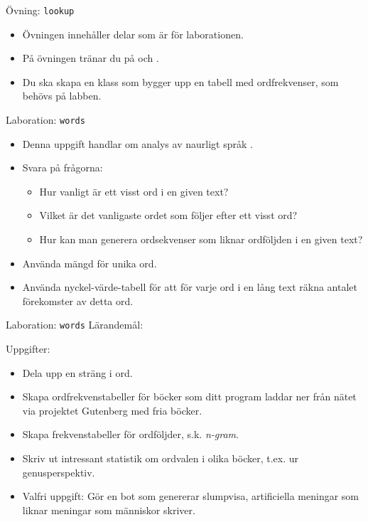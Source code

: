 


\begin{Slide}{Övning: \texttt{lookup}}
\begin{itemize}\SlideFontSmall
  \item Övningen innehåller delar som är  för laborationen.
  \item På övningen tränar du på  och .
  \item Du ska skapa en klass  som bygger upp en tabell med ordfrekvenser, som behövs på labben.
\end{itemize}
\end{Slide}

\begin{Slide}{Laboration: \texttt{words}}
\begin{itemize}
  \item Denna uppgift handlar om analys av naurligt språk .
  \item Svara på frågorna:
  \begin{itemize}%
  \item Hur vanligt är ett visst ord i en given text?
  \item Vilket är det vanligaste ordet som följer efter ett visst ord?
  \item Hur kan man generera ordsekvenser som liknar ordföljden i en given text?
  \end{itemize}
\item Använda mängd för unika ord.
\item Använda nyckel-värde-tabell för att för varje ord i en lång text räkna antalet förekomster av detta ord.
\end{itemize}
\end{Slide}


\begin{Slide}{Laboration: \texttt{words}}
Lärandemål:
\begin{itemize}\SlideFontSmall

\end{itemize}
Uppgifter:
\begin{itemize}\SlideFontSmall
  \item Dela upp en sträng i ord.
  \item Skapa ordfrekvenstabeller för böcker som ditt program laddar ner från nätet via projektet Gutenberg med fria böcker.
  \item Skapa frekvenstabeller för ordföljder, s.k. \emph{n-gram}.
  \item Skriv ut intressant statistik om ordvalen i olika böcker, t.ex. ur genusperspektiv.
  \item Valfri uppgift: Gör en bot som genererar slumpvisa, artificiella meningar som liknar meningar som människor skriver.
\end{itemize}
\end{Slide}


